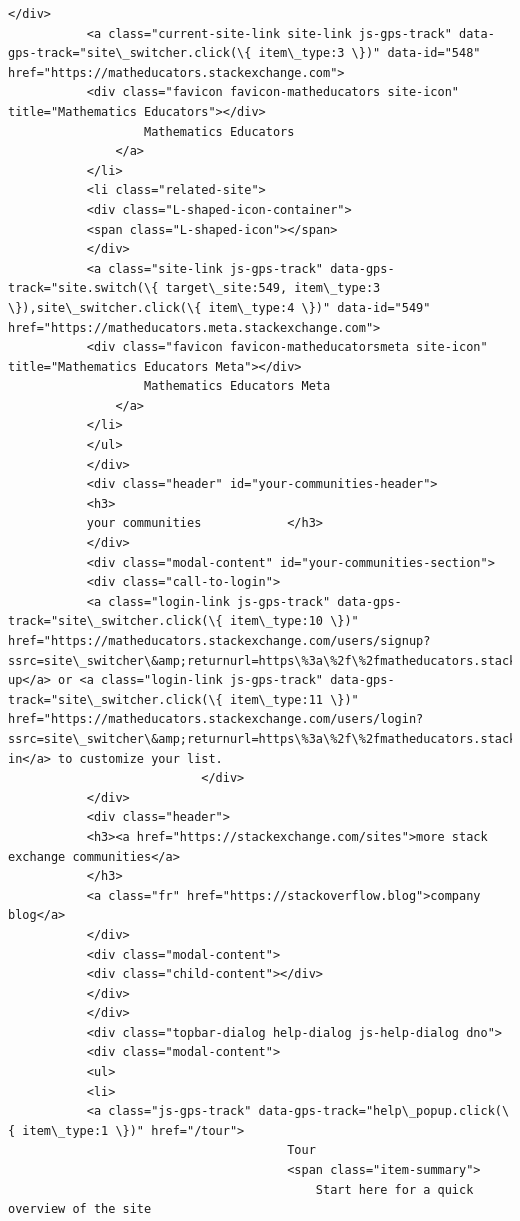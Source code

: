 \documentclass[11pt]{article}
\begin{document}
\begin{Verbatim}[commandchars=\\\{\}]
           </div>
           <a class="current-site-link site-link js-gps-track" data-gps-track="site\_switcher.click(\{ item\_type:3 \})" data-id="548" href="https://matheducators.stackexchange.com">
           <div class="favicon favicon-matheducators site-icon" title="Mathematics Educators"></div>
                   Mathematics Educators
               </a>
           </li>
           <li class="related-site">
           <div class="L-shaped-icon-container">
           <span class="L-shaped-icon"></span>
           </div>
           <a class="site-link js-gps-track" data-gps-track="site.switch(\{ target\_site:549, item\_type:3 \}),site\_switcher.click(\{ item\_type:4 \})" data-id="549" href="https://matheducators.meta.stackexchange.com">
           <div class="favicon favicon-matheducatorsmeta site-icon" title="Mathematics Educators Meta"></div>
                   Mathematics Educators Meta
               </a>
           </li>
           </ul>
           </div>
           <div class="header" id="your-communities-header">
           <h3>
           your communities            </h3>
           </div>
           <div class="modal-content" id="your-communities-section">
           <div class="call-to-login">
           <a class="login-link js-gps-track" data-gps-track="site\_switcher.click(\{ item\_type:10 \})" href="https://matheducators.stackexchange.com/users/signup?ssrc=site\_switcher\&amp;returnurl=https\%3a\%2f\%2fmatheducators.stackexchange.com\%2f">Sign up</a> or <a class="login-link js-gps-track" data-gps-track="site\_switcher.click(\{ item\_type:11 \})" href="https://matheducators.stackexchange.com/users/login?ssrc=site\_switcher\&amp;returnurl=https\%3a\%2f\%2fmatheducators.stackexchange.com\%2f">log in</a> to customize your list.
                           </div>
           </div>
           <div class="header">
           <h3><a href="https://stackexchange.com/sites">more stack exchange communities</a>
           </h3>
           <a class="fr" href="https://stackoverflow.blog">company blog</a>
           </div>
           <div class="modal-content">
           <div class="child-content"></div>
           </div>
           </div>
           <div class="topbar-dialog help-dialog js-help-dialog dno">
           <div class="modal-content">
           <ul>
           <li>
           <a class="js-gps-track" data-gps-track="help\_popup.click(\{ item\_type:1 \})" href="/tour">
                                       Tour
                                       <span class="item-summary">
                                           Start here for a quick overview of the site

\end{Verbatim}
\end{document}
